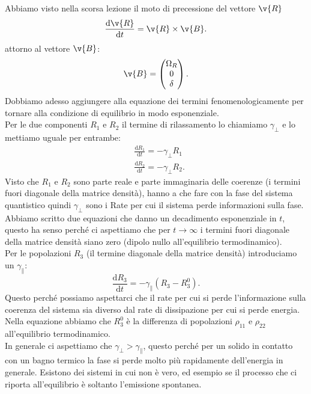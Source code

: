 Abbiamo visto nella scorsa lezione il moto di precessione del vettore $\v{R}$
\[
    \frac{\text{d} \v{R}}{\text{d} t} = \v{R}\times \v{B}
.\] 
attorno al vettore $\v{B}$:
\[
\v{B}=\begin{pmatrix} \Omega_R \\ 0 \\ \delta \end{pmatrix}
.\] 
Dobbiamo adesso aggiungere alla equazione dei termini fenomenologicamente per tornare alla condizione di equilibrio in modo esponenziale.\\
Per le due componenti $R_1$ e $R_2$ il termine di rilassamento lo chiamiamo $\gamma_{\perp}$ e lo mettiamo uguale per entrambe:
\[\begin{aligned}
    &\frac{\text{d} R_1}{\text{d} t} = -\gamma_\perp R_1\\
    &\frac{\text{d} R_2}{\text{d} t} = -\gamma_{\perp}R_2
.\end{aligned}\]
Visto che $R_1$  e $R_2$  sono parte reale e parte immaginaria delle coerenze (i termini fuori diagonale della matrice densità), hanno a che fare con la fase del sistema quantistico quindi $\gamma_\perp$ sono i Rate per cui il sistema perde informazioni sulla fase. \\
Abbiamo scritto due equazioni che danno un decadimento esponenziale in $t$, questo ha senso perché ci aspettiamo che per $t\to \infty$  i termini fuori diagonale della matrice densità siano zero (dipolo nullo all'equilibrio termodinamico).\\
Per le popolazioni $R_3$  (il termine diagonale della matrice densità) introduciamo un $\gamma_{\parallel}$:
\[
    \frac{\text{d} R_3}{\text{d} t} =-\gamma_\parallel \left(R_3-R_3^0\right)
.\] 
Questo perché possiamo aspettarci che il rate per cui si perde l'informazione sulla coerenza del sistema sia diverso dal rate di dissipazione per cui si perde energia. \\
Nella equazione abbiamo che $R_3^0$ è la differenza di popolazioni $\rho_{11}$  e $\rho_{22}$  all'equilibrio termodinamico.\\
In generale ci aspettiamo che $\gamma_{\perp}>\gamma_\parallel$, questo perché per un solido in contatto con un bagno termico la fase si perde molto più rapidamente dell'energia in generale. Esistono dei sistemi in cui non è vero, ed esempio se il processo che ci  riporta all'equilibrio è soltanto l'emissione spontanea. 
